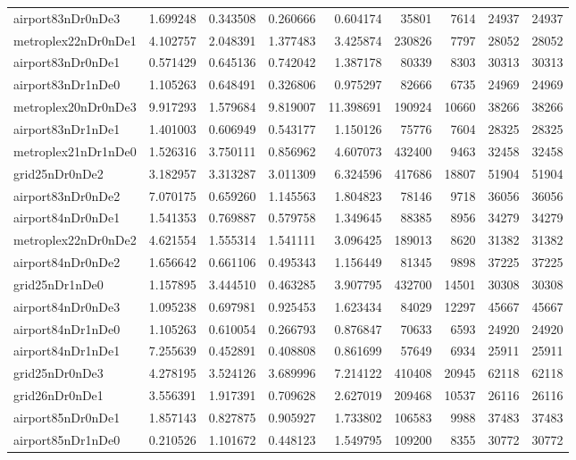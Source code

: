 \begin{longtable}{|l|r|r|r|r|r|r|r|r|}
airport83nDr0nDe3 & 1.699248 & 0.343508 & 0.260666 & 0.604174 & 35801 & 7614 & 24937 & 24937 \\
metroplex22nDr0nDe1 & 4.102757 & 2.048391 & 1.377483 & 3.425874 & 230826 & 7797 & 28052 & 28052 \\
airport83nDr0nDe1 & 0.571429 & 0.645136 & 0.742042 & 1.387178 & 80339 & 8303 & 30313 & 30313 \\
airport83nDr1nDe0 & 1.105263 & 0.648491 & 0.326806 & 0.975297 & 82666 & 6735 & 24969 & 24969 \\
metroplex20nDr0nDe3 & 9.917293 & 1.579684 & 9.819007 & 11.398691 & 190924 & 10660 & 38266 & 38266 \\
airport83nDr1nDe1 & 1.401003 & 0.606949 & 0.543177 & 1.150126 & 75776 & 7604 & 28325 & 28325 \\
metroplex21nDr1nDe0 & 1.526316 & 3.750111 & 0.856962 & 4.607073 & 432400 & 9463 & 32458 & 32458 \\
grid25nDr0nDe2 & 3.182957 & 3.313287 & 3.011309 & 6.324596 & 417686 & 18807 & 51904 & 51904 \\
airport83nDr0nDe2 & 7.070175 & 0.659260 & 1.145563 & 1.804823 & 78146 & 9718 & 36056 & 36056 \\
airport84nDr0nDe1 & 1.541353 & 0.769887 & 0.579758 & 1.349645 & 88385 & 8956 & 34279 & 34279 \\
metroplex22nDr0nDe2 & 4.621554 & 1.555314 & 1.541111 & 3.096425 & 189013 & 8620 & 31382 & 31382 \\
airport84nDr0nDe2 & 1.656642 & 0.661106 & 0.495343 & 1.156449 & 81345 & 9898 & 37225 & 37225 \\
grid25nDr1nDe0 & 1.157895 & 3.444510 & 0.463285 & 3.907795 & 432700 & 14501 & 30308 & 30308 \\
airport84nDr0nDe3 & 1.095238 & 0.697981 & 0.925453 & 1.623434 & 84029 & 12297 & 45667 & 45667 \\
airport84nDr1nDe0 & 1.105263 & 0.610054 & 0.266793 & 0.876847 & 70633 & 6593 & 24920 & 24920 \\
airport84nDr1nDe1 & 7.255639 & 0.452891 & 0.408808 & 0.861699 & 57649 & 6934 & 25911 & 25911 \\
grid25nDr0nDe3 & 4.278195 & 3.524126 & 3.689996 & 7.214122 & 410408 & 20945 & 62118 & 62118 \\
grid26nDr0nDe1 & 3.556391 & 1.917391 & 0.709628 & 2.627019 & 209468 & 10537 & 26116 & 26116 \\
airport85nDr0nDe1 & 1.857143 & 0.827875 & 0.905927 & 1.733802 & 106583 & 9988 & 37483 & 37483 \\
airport85nDr1nDe0 & 0.210526 & 1.101672 & 0.448123 & 1.549795 & 109200 & 8355 & 30772 & 30772 \\

\end{longtable}
